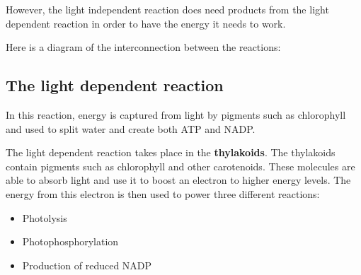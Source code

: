 \documentclass{article}
\begin{document}
However, the light independent reaction does need products from the light dependent reaction in order to have the energy it needs to work.

Here is a diagram of the interconnection between the reactions:

\begin{center}
\end{center}

\subsection*{The light dependent reaction}
In this reaction, energy is captured from light by pigments such as chlorophyll and used to split water and create both ATP and NADP.

The light dependent reaction takes place in the \textbf{thylakoids}. The thylakoids contain pigments such as chlorophyll and other carotenoids. These molecules are able to absorb light and use it to boost an electron to higher energy levels. The energy from this electron is then used to power three different reactions:
\begin {itemize}
 \item Photolysis
 \item Photophosphorylation
 \item Production of reduced NADP
\end{itemize}
\end{document}
